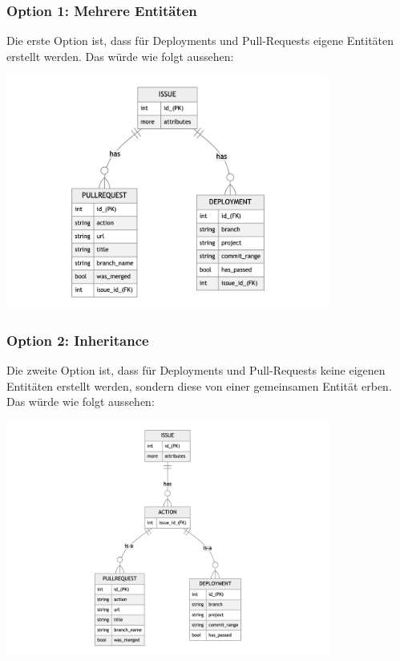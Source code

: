 \begin{minipage}{\textwidth}
  \subsubsection{Option 1: Mehrere Entitäten}
  Die erste Option ist, dass für Deployments und Pull-Requests eigene Entitäten erstellt werden. Das würde wie folgt aussehen:
  \begin{center}
    \includegraphics[width=0.8\textwidth]{images/erd/multiple.png}
    \label{fig:erd_multiple}
  \end{center}
\end{minipage}

\begin{minipage}{\textwidth}
  \subsubsection{Option 2: Inheritance}
  Die zweite Option ist, dass für Deployments und Pull-Requests keine eigenen Entitäten erstellt werden, sondern diese von
  einer gemeinsamen Entität erben. Das würde wie folgt aussehen:
  \begin{center}
    \includegraphics[width=0.8\textwidth]{images/erd/inheritance.png}
    \label{fig:erd_inheritance}
  \end{center}
\end{minipage}


